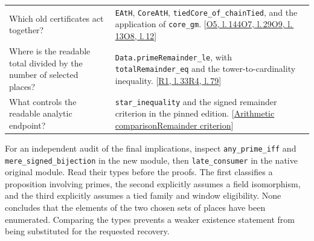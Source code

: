 \documentclass[12pt,letterpaper]{article}
\newcommand{\id}[1]{{\small\nolinkurl{#1}}}
\begin{document}
\begin{center}
\begin{tabularx}{\linewidth}{@{}p{.29\linewidth}Y@{}}
Which old certificates act together? & \id{EAtH}, \id{CoreAtH}, \id{tiedCore_of_chainTied}, and the application of \id{core_gm}.  {\footnotesize\sffamily\color{mute}[\href{https://github.com/nousentllc/riemann-hypothesis/blob/40e56bab026552e089d7afcfeff08d2defb9c005/src/Formalism/SharpRestriction/RamificationFrobenius/TotientGaloisClasses/ExplicitFormulaErrorOfHostConditions.lean\#L144}{O5, l.\,144}\enspace \href{https://github.com/nousentllc/riemann-hypothesis/blob/40e56bab026552e089d7afcfeff08d2defb9c005/src/Development/AutomorphicArithmetic/PrimitiveCosets/CoreAtH.lean\#L29}{O7, l.\,29}\enspace \href{https://github.com/nousentllc/riemann-hypothesis/blob/40e56bab026552e089d7afcfeff08d2defb9c005/src/Development/AutomorphicArithmetic/PrimitiveCosets/LevelGmLeOnFamilyScales.lean\#L13}{O9, l.\,13}\enspace \href{https://github.com/nousentllc/riemann-hypothesis/blob/40e56bab026552e089d7afcfeff08d2defb9c005/src/Development/AutomorphicArithmetic/PrimitiveCosets/CoreGm.lean\#L12}{O8, l.\,12}]}\\
Where is the readable total divided by the number of selected places? & \id{Data.primeRemainder_le}, with \id{totalRemainder_eq} and the tower-to-cardinality inequality.  {\footnotesize\sffamily\color{mute}[\href{https://github.com/leanprover-community/riemann-hypothesis/blob/e063a923620ee7787b4a1270421478645bf66bdb/src/New/Reduction/OneSidedBound.lean\#L33}{R1, l.\,33}\enspace \href{https://github.com/leanprover-community/riemann-hypothesis/blob/e063a923620ee7787b4a1270421478645bf66bdb/src/New/Reduction/PrimeSums.lean\#L79}{R4, l.\,79}]}\\
What controls the readable analytic endpoint? & \id{star_inequality} and the signed remainder criterion in the pinned edition.  {\footnotesize\sffamily\color{mute}[\href{https://github.com/leanprover-community/riemann-hypothesis/blob/e063a923620ee7787b4a1270421478645bf66bdb/src/New/Reduction/MainInequality.lean\#L87}{Arithmetic comparison}\enspace \href{https://github.com/leanprover-community/riemann-hypothesis/blob/e063a923620ee7787b4a1270421478645bf66bdb/src/New/Reduction/Zeros/Criterion.lean\#L37}{Remainder criterion}]}\\\bottomrule
\end{tabularx}\end{center}

For an independent audit of the final implications, inspect \id{any_prime_iff} and \id{mere_signed_bijection} in the new module, then \id{late_consumer} in the native original module. Read their types before the proofs. The first classifies a proposition involving primes, the second explicitly assumes a field isomorphism, and the third explicitly assumes a tied family and window eligibility. None concludes that the elements of the two chosen sets of places have been enumerated. Comparing the types prevents a weaker existence statement from being substituted for the requested recovery.
\end{document}
